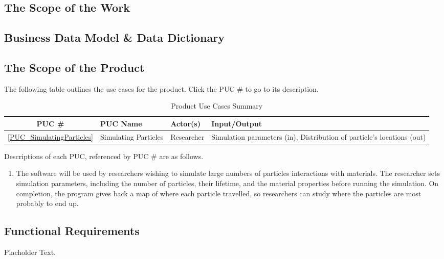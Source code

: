 \documentclass[12pt]{article}
\begin{document}
\subsection{The Scope of the Work} %

\subsection{Business Data Model \& Data Dictionary} %

\subsection{The Scope of the Product}
The following table outlines the use cases for the product. Click the PUC \# to go to its description.

\begin{table}[h]
\centering
\begin{tabularx}{\textwidth}{|c|l|l|X|}
\hline
PUC \# & PUC Name & Actor(s) & Input/Output\\
\hline\hline
\ref{PUC_SimulatingParticles} & Simulating Particles & Researcher & Simulation parameters (in), Distribution of particle's locations (out)\\
\hline
\end{tabularx}
\caption{Product Use Cases Summary}
\end{table}

Descriptions of each PUC, referenced by PUC \# are as follows.
\begin{enumerate}
\item \label{PUC_SimulatingParticles} The software will be used by researchers wishing to simulate large numbers of particles interactions with materials. The researcher sets simulation parameters, including the number of particles, their lifetime, and the material properties before running the simulation. On completion, the program gives back a map of where each particle travelled, so researchers can study where the particles are most probably to end up.
\end{enumerate}

\subsection{Functional Requirements} %
Placholder Text.
\end{document}
